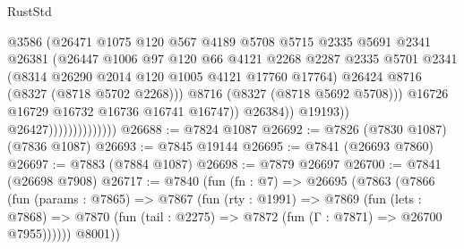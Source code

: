 \begin{lexlean}{RustStd}
\begin{coremodule}
                                            @3586
                                            (@26471
                                              @1075
                                              @120
                                              @567
                                              @4189
                                              @5708
                                              @5715
                                              @2335
                                              @5691
                                              @2341
                                              @26381
                                              (@26447
                                                @1006
                                                @97
                                                @120
                                                @66
                                                @4121
                                                @2268
                                                @2287
                                                @2335
                                                @5701
                                                @2341
                                                (@8314 @26290 @2014 @120 @1005 @4121 @17760 @17764)
                                                @26424
                                                @8716
                                                (@8327 (@8718 @5702 @2268)))
                                              @8716
                                              (@8327 (@8718 @5692 @5708)))
                                            @16726
                                            @16729
                                            @16732
                                            @16736
                                            @16741
                                            @16747))
                                        @26384))
                                    @19193))
                                @26427))))))))))))))
@26688 := @7824 @1087
@26692 := @7826 (@7830 @1087) (@7836 @1087)
@26693 := @7845 @19144
@26695 := @7841 (@26693 @7860)
@26697 := @7883 (@7884 @1087)
@26698 := @7879 @26697
@26700 := @7841 (@26698 @7908)
@26717 := @7840
    (fun (fn : @7) =>
    @26695
      (@7863
        (@7866
          (fun (params : @7865) =>
          @7867
            (fun (rty : @1991) =>
            @7869
              (fun (lets : @7868) =>
              @7870 (fun (tail : @2275) => @7872 (fun (Γ : @7871) => @26700 @7955))))))
        @8001))

\end{coremodule}
\end{lexlean}
